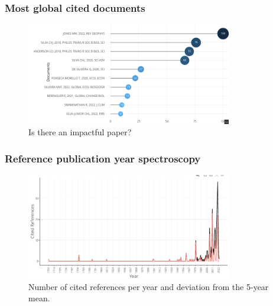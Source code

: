 \documentclass[aspectratio=169]{beamer}
\begin{document}
\begin{frame}
  \frametitle{Most global cited documents}
  \begin{figure}
    \centering
    \includegraphics[width=0.8\textwidth]
    {img/most_global_cited_documents.png}
    \caption{Is there an impactful paper?}
    \label{fig:most_global_cited_documents}
  \end{figure}
\end{frame}


\begin{frame}
  \frametitle{Reference publication year spectroscopy}
  \begin{figure}
    \centering
    \includegraphics[width=0.8\textwidth]
    {img/references_spectroscopy.png}
    \caption{Number of cited references per year and deviation from the 5-year
    mean.}
    \label{fig:references_spectroscopy}
  \end{figure}
\end{frame}
\end{document}
